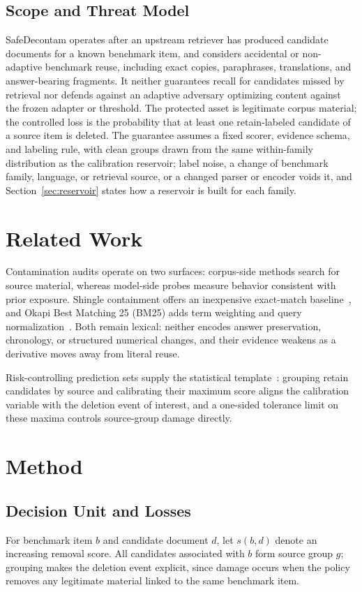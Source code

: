 \documentclass[conference]{IEEEtran}
\begin{document}
\subsection{Scope and Threat Model}
SafeDecontam operates after an upstream retriever has produced candidate documents for a known benchmark item, and considers accidental or non-adaptive benchmark reuse, including exact copies, paraphrases, translations, and answer-bearing fragments. It neither guarantees recall for candidates missed by retrieval nor defends against an adaptive adversary optimizing content against the frozen adapter or threshold. The protected asset is legitimate corpus material; the controlled loss is the probability that at least one retain-labeled candidate of a source item is deleted. The guarantee assumes a fixed scorer, evidence schema, and labeling rule, with clean groups drawn from the same within-family distribution as the calibration reservoir; label noise, a change of benchmark family, language, or retrieval source, or a changed parser or encoder voids it, and Section~\ref{sec:reservoir} states how a reservoir is built for each family.

\section{Related Work}
Contamination audits operate on two surfaces: corpus-side methods search for source material, whereas model-side probes measure behavior consistent with prior exposure. Shingle containment offers an inexpensive exact-match baseline~\cite{broder1997}, and Okapi Best Matching 25 (BM25) adds term weighting and query normalization~\cite{robertson2009}. Both remain lexical: neither encodes answer preservation, chronology, or structured numerical changes, and their evidence weakens as a derivative moves away from literal reuse.

Risk-controlling prediction sets supply the statistical template~\cite{bates2021}: grouping retain candidates by source and calibrating their maximum score aligns the calibration variable with the deletion event of interest, and a one-sided tolerance limit on these maxima controls source-group damage directly.



\section{Method}
\subsection{Decision Unit and Losses}
For benchmark item $b$ and candidate document $d$, let $s(b,d)$ denote an increasing removal score. All candidates associated with $b$ form source group $g$; grouping makes the deletion event explicit, since damage occurs when the policy removes any legitimate material linked to the same benchmark item.
\end{document}
